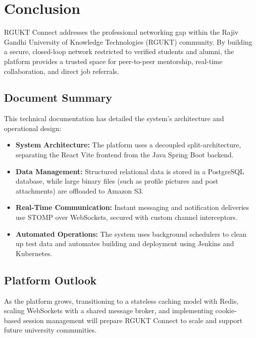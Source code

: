 \chapter{Conclusion}
\label{ch:conclusion}

RGUKT Connect addresses the professional networking gap within the Rajiv Gandhi University of Knowledge Technologies (RGUKT) community. By building a secure, closed-loop network restricted to verified students and alumni, the platform provides a trusted space for peer-to-peer mentorship, real-time collaboration, and direct job referrals.

\section{Document Summary}
This technical documentation has detailed the system's architecture and operational design:
\begin{itemize}
    \item \textbf{System Architecture:} The platform uses a decoupled split-architecture, separating the React Vite frontend from the Java Spring Boot backend.
    \item \textbf{Data Management:} Structured relational data is stored in a PostgreSQL database, while large binary files (such as profile pictures and post attachments) are offloaded to Amazon S3.
    \item \textbf{Real-Time Communication:} Instant messaging and notification deliveries use STOMP over WebSockets, secured with custom channel interceptors.
    \item \textbf{Automated Operations:} The system uses background schedulers to clean up test data and automates building and deployment using Jenkins and Kubernetes.
\end{itemize}

\section{Platform Outlook}
As the platform grows, transitioning to a stateless caching model with Redis, scaling WebSockets with a shared message broker, and implementing cookie-based session management will prepare RGUKT Connect to scale and support future university communities.
